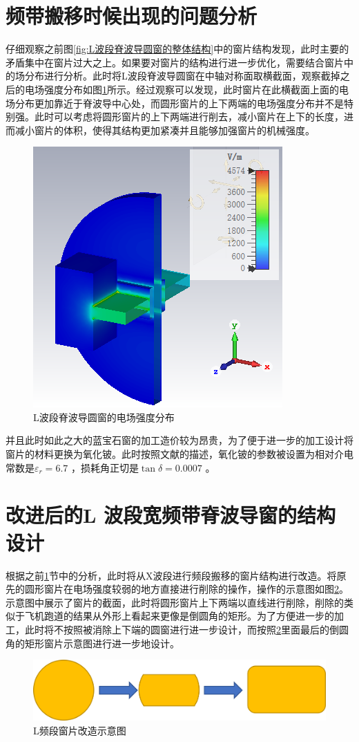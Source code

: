\documentclass[master]{thesis-uestc}
\begin{document}
\section{频带搬移时候出现的问题分析}\label{sec:频带搬移时候出现的问题分析}
仔细观察之前图\ref{fig:L波段脊波导圆窗的整体结构}中的窗片结构发现，此时主要的矛盾集中在窗片过大之上。如果要对窗片的结构进行进一步优化，需要结合窗片中的场分布进行分析。此时将L波段脊波导圆窗在中轴对称面取横截面，观察截掉之后的电场强度分布如图\ref{fig:L波段脊波导圆窗的电场强度分布}所示。经过观察可以发现，此时窗片在此横截面上面的电场分布更加靠近于脊波导中心处，而圆形窗片的上下两端的电场强度分布并不是特别强。此时可以考虑将圆形窗片的上下两端进行削去，减小窗片在上下的长度，进而减小窗片的体积，使得其结构更加紧凑并且能够加强窗片的机械强度。
\begin{figure}[!htb]
    \centering
    \includegraphics[width=0.3\linewidth]{pic/chapter4/L波段脊波导圆窗的电场强度分布.png}
    \caption{L波段脊波导圆窗的电场强度分布}
    \label{fig:L波段脊波导圆窗的电场强度分布}
\end{figure}

并且此时如此之大的蓝宝石窗的加工造价较为昂贵，为了便于进一步的加工设计将窗片的材料更换为氧化铍。此时按照文献\cite{thumm_2020_State}的描述，氧化铍的参数被设置为相对介电常数是$\varepsilon_r = 6.7$ ，损耗角正切是$\tan \delta = 0.0007$ 。

\section{改进后的L 波段宽频带脊波导窗的结构设计}
根据之前\ref{sec:频带搬移时候出现的问题分析}节中的分析，此时将从X波段进行频段搬移的窗片结构进行改造。将原先的圆形窗片在电场强度较弱的地方直接进行削除的操作，操作的示意图如图\ref{fig:L频段改造}。示意图中展示了窗片的截面，此时将圆形窗片上下两端以直线进行削除，削除的类似于飞机跑道的结果从外形上看起来更像是倒圆角的矩形。为了方便进一步的加工，此时将不按照被消除上下端的圆窗进行进一步设计，而按照\ref{fig:L频段改造}里面最后的倒圆角的矩形窗片示意图进行进一步地设计。
\begin{figure}[!htb]
    \centering
    \includegraphics[width=0.35\linewidth]{pic/chapter4/L脊波导窗片改造.png}
    \caption{L频段窗片改造示意图}
    \label{fig:L频段改造}
\end{figure}
\end{document}
